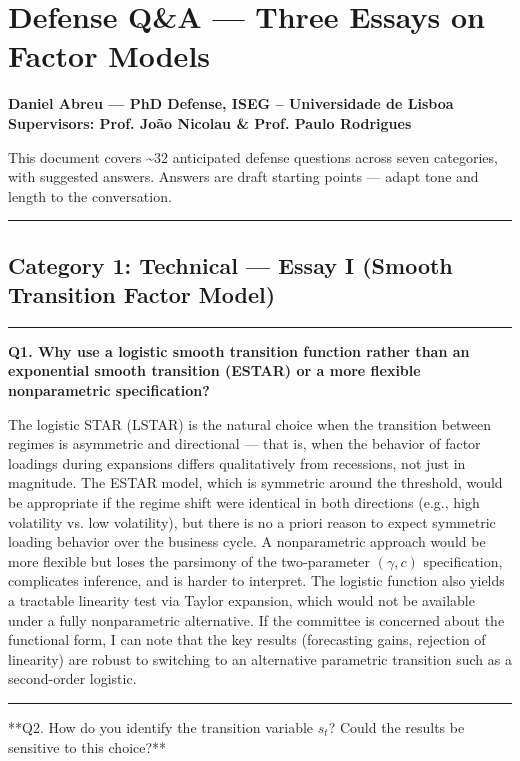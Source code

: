 \documentclass[11pt,a4paper]{article}
\begin{document}
\section*{Defense Q\&A — Three Essays on Factor Models}

\textbf{Daniel Abreu — PhD Defense, ISEG – Universidade de Lisboa}  
\textbf{Supervisors: Prof. João Nicolau \& Prof. Paulo Rodrigues}

This document covers \textasciitilde{}32 anticipated defense questions across seven categories, with suggested answers. Answers are draft starting points — adapt tone and length to the conversation.

\medskip\hrule\medskip

\subsection*{Category 1: Technical — Essay I (Smooth Transition Factor Model)}

\medskip\hrule\medskip

\textbf{Q1. Why use a logistic smooth transition function rather than an exponential smooth transition (ESTAR) or a more flexible nonparametric specification?}

The logistic STAR (LSTAR) is the natural choice when the transition between regimes is asymmetric and directional — that is, when the behavior of factor loadings during expansions differs qualitatively from recessions, not just in magnitude. The ESTAR model, which is symmetric around the threshold, would be appropriate if the regime shift were identical in both directions (e.g., high volatility vs. low volatility), but there is no a priori reason to expect symmetric loading behavior over the business cycle. A nonparametric approach would be more flexible but loses the parsimony of the two-parameter $(γ, c)$ specification, complicates inference, and is harder to interpret. The logistic function also yields a tractable linearity test via Taylor expansion, which would not be available under a fully nonparametric alternative. If the committee is concerned about the functional form, I can note that the key results (forecasting gains, rejection of linearity) are robust to switching to an alternative parametric transition such as a second-order logistic.

\medskip\hrule\medskip

**Q2. How do you identify the transition variable $s_t$? Could the results be sensitive to this choice?**
\end{document}
